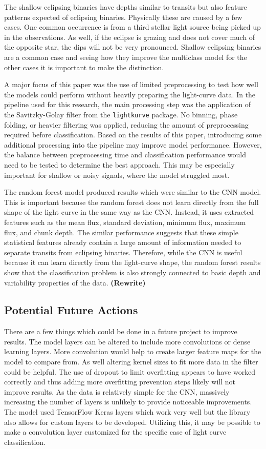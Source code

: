 The shallow eclipsing binaries have depths similar to transits but also feature patterns expected of eclipsing binaries. Physically these are caused by a few cases. One common occurrence is from a third stellar light source being picked up in the observations. As well, if the eclipse is grazing and does not cover much of the opposite star, the dips will not be very pronounced. Shallow eclipsing binaries are a common case and seeing how they improve the multiclass model for the other cases it is important to make the distinction.  

A major focus of this paper was the use of limited preprocessing to test how well the models could perform without heavily preparing the light-curve data. In the pipeline used for this research, the main processing step was the application of the Savitzky-Golay filter from the \texttt{lightkurve} package. No binning, phase folding, or heavier filtering was applied, reducing the amount of preprocessing required before classification. Based on the results of this paper, introducing some additional processing into the pipeline may improve model performance. However, the balance between preprocessing time and classification performance would need to be tested to determine the best approach. This may be especially important for shallow or noisy signals, where the model struggled most.

The random forest model produced results which were similar to the CNN model. This is important because the random forest does not learn directly from the full shape of the light curve in the same way as the CNN. Instead, it uses extracted features such as the mean flux, standard deviation, minimum flux, maximum flux, and chunk depth. The similar performance suggests that these simple statistical features already contain a large amount of information needed to separate transits from eclipsing binaries. Therefore, while the CNN is useful because it can learn directly from the light-curve shape, the random forest results show that the classification problem is also strongly connected to basic depth and variability properties of the data. \textbf{(Rewrite)}


\subsection{Potential Future Actions}

There are a few things which could be done in a future project to improve results. The model layers can be altered to include more convolutions or dense learning layers. More convolution would help to create larger feature maps for the model to compare from. As well altering kernel sizes to fit more data in the filter could be helpful. The use of dropout to limit overfitting appears to have worked correctly and thus adding more overfitting prevention steps likely will not improve results. As the data is relatively simple for the CNN, massively increasing the number of layers is unlikely to provide noticeable improvements. The model used TensorFlow Keras layers which work very well but the library also allows for custom layers to be developed. Utilizing this, it may be possible to make a convolution layer customized for the specific case of light curve classification. 

